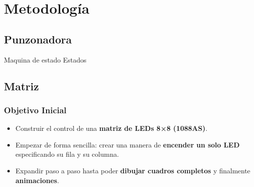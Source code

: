\section{Metodología}
\subsection{Punzonadora}
Maquina de estado
Estados

\vspace{10em}

\subsection{Matriz}

\subsubsection{Objetivo Inicial}
\begin{itemize}[leftmargin=2em]
    \item Construir el control de una \textbf{matriz de LEDs 8×8 (1088AS)}.
    \item Empezar de forma sencilla: crear una manera de \textbf{encender un solo LED} especificando su fila y su columna.
    \item Expandir paso a paso hasta poder \textbf{dibujar cuadros completos} y finalmente \textbf{animaciones}.
\end{itemize}

